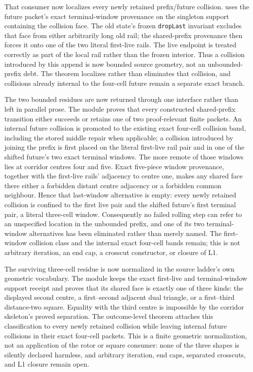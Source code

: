 \documentclass[11pt]{article}
\theoremstyle{definition}
\begin{document}
That consumer now localizes every newly retained prefix/future collision.
uses the future packet's exact terminal-window provenance on the singleton
support containing the collision face.  The old state's frozen
\texttt{dropLast} invariant excludes that face from either arbitrarily long
old rail; the shared-prefix provenance then forces it onto one of the two
literal first-live rails.  The live endpoint is treated correctly as part of
the local rail rather than the frozen interior.  Thus a collision introduced
by this append is now bounded source geometry, not an unbounded-prefix debt.
The theorem localizes rather than eliminates that collision, and collisions
already internal to the four-cell future remain a separate exact branch.

The two bounded residues are now returned through one interface rather than
left in parallel prose.  The module
proves that every constructed shared-prefix transition either succeeds or
retains one of two proof-relevant finite packets.  An internal future
collision is promoted to the existing exact four-cell collision band,
including the stored middle repair when applicable; a collision introduced
by joining the prefix is first placed on the literal first-live rail pair and
in one of the shifted future's two exact terminal windows.  The more remote
of those windows lies at corridor centres four and five.  Exact five-piece
window provenance, together with the first-live rails' adjacency to centre
one, makes any shared face there either a forbidden distant centre adjacency
or a forbidden common neighbour.  Hence that last-window alternative is
empty: every newly retained collision is confined to the first live pair and
the shifted future's first terminal pair, a literal three-cell window.
Consequently no failed rolling step can refer to an unspecified location in
the unbounded prefix, and one of its two terminal-window alternatives has
been eliminated rather than merely named.  The first-window collision class
and the internal exact four-cell bands remain; this is not arbitrary
iteration, an end cap, a crosscut constructor, or closure of L1.

The surviving three-cell residue is now normalized in the source ladder's
own geometric vocabulary.  The module
keeps the exact first-live and terminal-window support receipt and proves that
its shared face is exactly one of three kinds: the displayed second centre, a
first--second adjacent dual triangle, or a first--third distance-two square.
Equality with the third centre is impossible by the corridor skeleton's
proved separation.  The outcome-level theorem attaches this classification
to every newly retained collision while leaving internal future collisions
in their exact four-cell packets.  This is a finite geometric normalization,
not an application of the rotor or square consumer: none of the three shapes
is silently declared harmless, and arbitrary iteration, end caps, separated
crosscuts, and L1 closure remain open.
\end{document}
